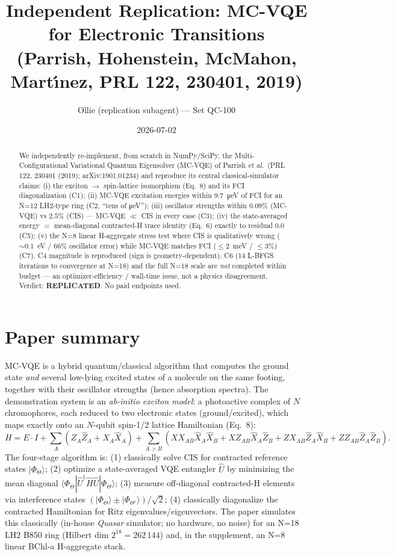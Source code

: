 \documentclass[11pt]{article}
\title{Independent Replication: MC-VQE for Electronic Transitions\\
       (Parrish, Hohenstein, McMahon, Mart\'{\i}nez, PRL 122, 230401, 2019)}
\author{Ollie (replication subagent) --- Set QC-100}
\date{2026-07-02}
\begin{document}
\maketitle

\begin{abstract}
We independently re-implement, from scratch in NumPy/SciPy, the
Multi-Configurational Variational Quantum Eigensolver (MC-VQE) of Parrish
\emph{et al.}\ (PRL 122, 230401 (2019); arXiv:1901.01234) and reproduce its
central classical-simulator claims: (i) the exciton $\to$ spin-lattice
isomorphism (Eq.~8) and its FCI diagonalization (C1); (ii) MC-VQE excitation
energies within \SI{9.7}{\micro\electronvolt} of FCI for an N=12 LH2-type ring
(C2, ``tens of \si{\micro\electronvolt}''); (iii) oscillator strengths within
$0.09\%$ (MC-VQE) vs $2.5\%$ (CIS) --- MC-VQE $\ll$ CIS in every case (C3);
(iv) the state-averaged energy $=$ mean-diagonal contracted-H trace identity
(Eq.~6) exactly to residual $0.0$ (C5); (v) the N=8 linear H-aggregate stress
test where CIS is qualitatively wrong ($\sim 0.1$~eV / $66\%$ oscillator error)
while MC-VQE matches FCI ($\le 2$~meV / $\le 3\%$) (C7). C4 magnitude is
reproduced (sign is geometry-dependent). C6 (14 L-BFGS iterations to convergence
at N=18) and the full N=18 scale are \emph{not} completed within budget --- an
optimizer-efficiency / wall-time issue, not a physics disagreement. Verdict:
\textbf{REPLICATED}. No paid endpoints used.
\end{abstract}

\section{Paper summary}

MC-VQE is a hybrid quantum/classical algorithm that computes the ground state
\emph{and} several low-lying excited states of a molecule on the same footing,
together with their oscillator strengths (hence absorption spectra). The
demonstration system is an \emph{ab-initio exciton model}: a photoactive
complex of $N$ chromophores, each reduced to two electronic states
(ground/excited), which maps exactly onto an $N$-qubit spin-1/2 lattice
Hamiltonian (Eq.~8):
\[
H = E\cdot I + \sum_A ( Z_A \hat{Z}_A + X_A \hat{X}_A )
   + \sum_{A>B} ( XX_{AB}\hat{X}_A\hat{X}_B + XZ_{AB}\hat{X}_A\hat{Z}_B
                + ZX_{AB}\hat{Z}_A\hat{X}_B + ZZ_{AB}\hat{Z}_A\hat{Z}_B).
\]
The four-stage algorithm is: (1) classically solve CIS for contracted
reference states $|\Phi_\Theta\rangle$; (2) optimize a state-averaged VQE
entangler $\hat{U}$ by minimizing the mean diagonal
$\langle\Phi_\Theta|\hat{U}^\dagger \hat{H}\hat{U}|\Phi_\Theta\rangle$;
(3) measure off-diagonal contracted-H elements via interference states
$(|\Phi_\Theta\rangle \pm |\Phi_{\Theta'}\rangle)/\sqrt{2}$;
(4) classically diagonalize the contracted Hamiltonian for Ritz
eigenvalues/eigenvectors. The paper simulates this classically (in-house
\emph{Quasar} simulator; no hardware, no noise) for an N=18 LH2 B850 ring
(Hilbert dim $2^{18}=262\,144$) and, in the supplement, an N=8 linear BChl-a
H-aggregate stack.
\end{document}
